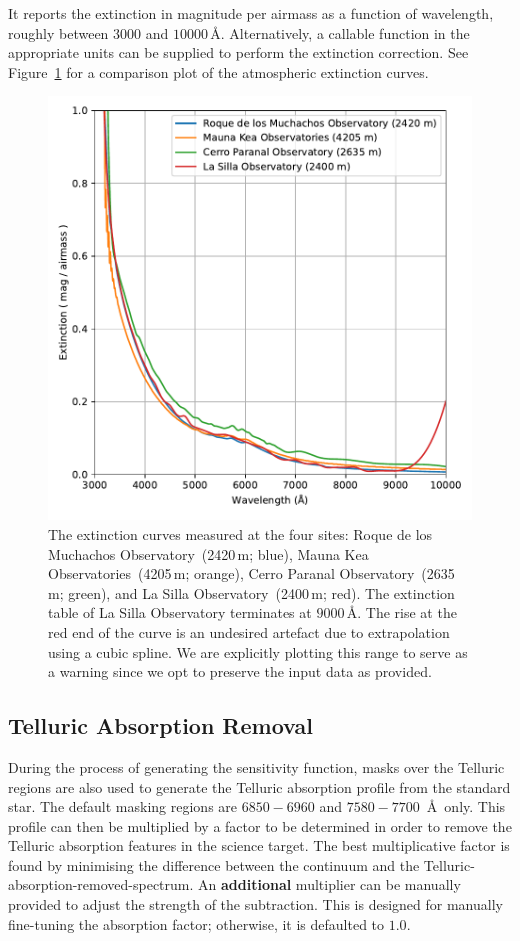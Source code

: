 \documentclass[fleqn,usenatbib]{mnras}
\begin{document}
It reports the extinction in magnitude per airmass as a
function of wavelength, roughly between $3000$ and $10000$\,\AA.
Alternatively, a callable function in the appropriate units can be
supplied to perform the extinction correction. See Figure~\ref{fig:extinction}
for a comparison plot of the atmospheric extinction curves.

\begin{figure}
    \centering
    \includegraphics[width=\columnwidth]{fig_07_extinction_curves.pdf}
    \caption{The extinction curves measured at the four sites: Roque de los Muchachos
    Observatory~(2420\,m; blue), Mauna Kea Observatories~(4205\,m; orange),
    Cerro Paranal Observatory~(2635\,m; green), and La Silla Observatory~(2400\,m; red).
    The extinction table of La Silla Observatory terminates at $9000$\,\AA. The rise at
    the red end of the curve is an undesired artefact due to extrapolation using a
    cubic spline. We are explicitly plotting this range to serve as a warning since we
    opt to preserve the input data as provided.}
    \label{fig:extinction}
\end{figure}

\subsection{Telluric Absorption Removal}
During the process of generating the sensitivity function, masks over
the Telluric regions are also used to generate the Telluric absorption
profile from the standard star. The default masking regions are $6850-6960$
and $7580-7700$\ \AA\ only. This profile can then be multiplied
by a factor to be determined in order to remove the Telluric absorption
features in the science target. The best multiplicative factor is found
by minimising the difference between the continuum and the
Telluric-absorption-removed-spectrum. An \textbf{additional} multiplier can
be manually provided to adjust the strength of the subtraction. This is
designed for manually fine-tuning the absorption factor; otherwise, it is
defaulted to $1.0$.
\end{document}
